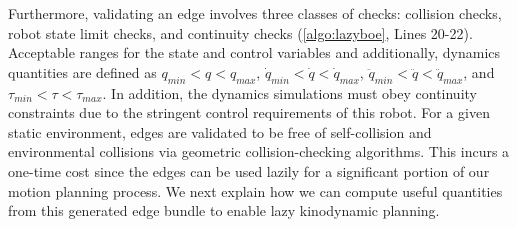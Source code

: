 Furthermore, validating an edge involves three classes of checks: collision checks, robot state limit checks, and continuity checks (\cref{algo:lazyboe}, Lines 20-22).
Acceptable ranges for the state and control variables and additionally, dynamics quantities are defined as $q_{min} < q < q_{max}$, $\dot{q}_{min} < \dot{q} < \dot{q}_{max}$, $\ddot{q}_{min} < \ddot{q} < \ddot{q}_{max}$, and $\tau_{min} < \tau < \tau_{max}$.
In addition, the dynamics simulations must obey continuity constraints due to the stringent control requirements of this robot.
For a given static environment, edges are validated to be free of self-collision and environmental collisions via geometric collision-checking algorithms. This incurs a one-time cost since the edges can be used lazily for a significant portion of our motion planning process.
We next explain how we can compute useful quantities from this generated edge bundle to enable lazy kinodynamic planning.
